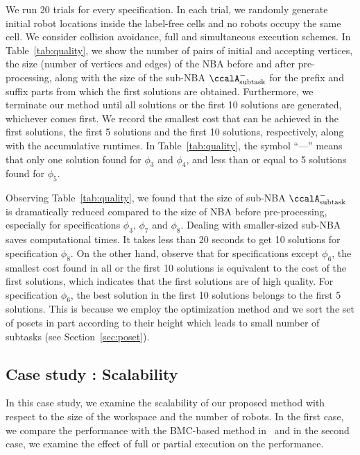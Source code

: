 \documentclass[Afour,sageh,times]{sagej}
\newcommand{\auto}[1]{\ccalA_{\textup{#1}}}
\newcommand{\RNum}[1]{\uppercase\expandafter{\romannumeral #1\relax}}
\begin{document}
{{We run 20 trials for every specification. In each trial, we randomly generate initial robot locations inside the label-free cells and no robots occupy the same cell. We consider collision avoidance, full  and simultaneous execution schemes. In Table~\ref{tab:quality}, we show  the number of pairs of initial and accepting vertices,  the size (number of vertices and edges) of the NBA before and after pre-processing, along with the size of the sub-NBA $\auto{subtask}^-$ for the prefix and suffix parts from which the first solutions are obtained. Furthermore, we terminate our method until all solutions or the first 10 solutions are generated, whichever comes first. We record the smallest cost that can be achieved in the first solutions, the first 5 solutions and the first 10 solutions, respectively, along with the accumulative runtimes. In  Table~\ref{tab:quality}, the symbol ``---'' means that only one solution found for $\phi_3$ and $\phi_4$, and less than or equal to 5 solutions found for $\phi_5$.

Observing Table~\ref{tab:quality}, we found that  the size of sub-NBA $\auto{subtask}^-$ is dramatically reduced compared to the size of NBA before pre-processing, especially for specifications $\phi_3$, $\phi_7$ and $\phi_8$. Dealing with smaller-sized sub-NBA saves computational times. It takes less than 20 seconds to get 10 solutions for specification $\phi_8$. On the other hand, observe that for specifications except $\phi_6$, the smallest cost  found in all or the first 10 solutions is equivalent to the cost of the first solutions, which indicates that the first solutions are of  high quality. For specification $\phi_6$, the best solution in the first 10 solutions belongs to  the first 5 solutions. This is  because we employ the optimization method and we sort the set of  posets in part according to their height which leads to small number of subtasks (see Section~\ref{sec:poset}).



\subsection{Case study \RNum{3}: Scalability}

In this case study, we examine the scalability of our proposed method with respect to the size of the workspace and the number of robots. In the first case, we  compare the performance with the BMC-based method in~\cite{sahin2019multi} and in the second case, we examine the effect of full or partial  execution on the performance.


}}
\end{document}

